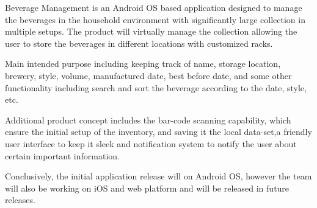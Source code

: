 Beverage Management is an Android OS based application designed to manage the beverages in the household environment with significantly large collection in multiple setups. The product will virtually manage the collection allowing the user to store the beverages in different locations with customized racks.

Main intended purpose including keeping track of name, storage location, brewery, style, volume, manufactured date, best before date, and some other functionality including search and sort the beverage according to the date, style, etc.   

Additional product concept includes the bar-code scanning capability, which ensure the initial setup of the inventory, and saving it the local data-set,a friendly user interface to keep it sleek and notification system to notify the user about certain important information. 

Conclusively, the initial application release will on Android OS, however the team will also be working on iOS and web platform and will be released in future releases. 